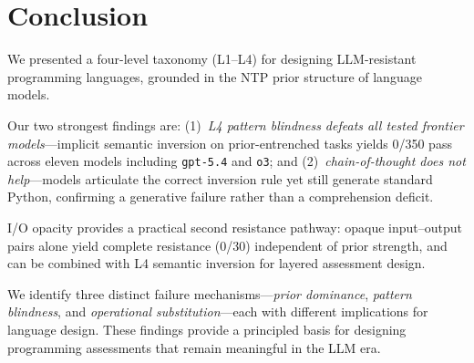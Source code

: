 \section{Conclusion}
We presented a four-level taxonomy (L1--L4) for designing LLM-resistant programming languages, grounded in the NTP prior structure of language models.

Our two strongest findings are: (1)~\emph{L4 pattern blindness defeats all tested frontier models}---implicit semantic inversion on prior-entrenched tasks yields 0/350 pass across eleven models including \texttt{gpt-5.4} and \texttt{o3}; and (2)~\emph{chain-of-thought does not help}---models articulate the correct inversion rule yet still generate standard Python, confirming a generative failure rather than a comprehension deficit.

I/O opacity provides a practical second resistance pathway: opaque input--output pairs alone yield complete resistance (0/30) independent of prior strength, and can be combined with L4 semantic inversion for layered assessment design.

We identify three distinct failure mechanisms---\emph{prior dominance}, \emph{pattern blindness}, and \emph{operational substitution}---each with different implications for language design. These findings provide a principled basis for designing programming assessments that remain meaningful in the LLM era.
